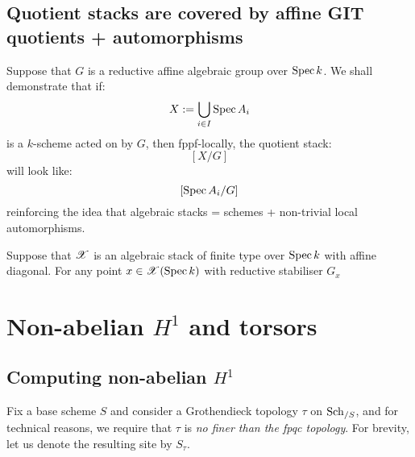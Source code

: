         \subsection{Quotient stacks are covered by affine GIT quotients + automorphisms}
            Suppose that $G$ is a reductive affine algebraic group over $\operatorname{Spec} k$. We shall demonstrate that if:
                $$X := \bigcup_{i \in I} \operatorname{Spec} A_i$$
            is a $k$-scheme acted on by $G$, then fppf-locally, the quotient stack:
                $$[X/G]$$
            will look like:
                $$[\operatorname{Spec} A_i/G]$$
            reinforcing the idea that algebraic stacks = schemes + non-trivial local automorphisms.

            \begin{theorem}
                Suppose that $\mathscr{X}$ is an algebraic stack of finite type over $\operatorname{Spec} k$ with affine diagonal. For any point $x \in \mathscr{X}(\operatorname{Spec} k)$ with reductive stabiliser $G_x$
            \end{theorem}

    \section{Non-abelian \texorpdfstring{$H^1$}{} and torsors}
        \subsection{Computing non-abelian \texorpdfstring{$H^1$}{}}
            \begin{convention}
                Fix a base scheme $S$ and consider a Grothendieck topology $\tau$ on $\mathrm{Sch}_{/S}$, and for technical reasons, we require that $\tau$ is \textit{no finer than the fpqc topology}. For brevity, let us denote the resulting site by $S_{\tau}$. 
            \end{convention}


